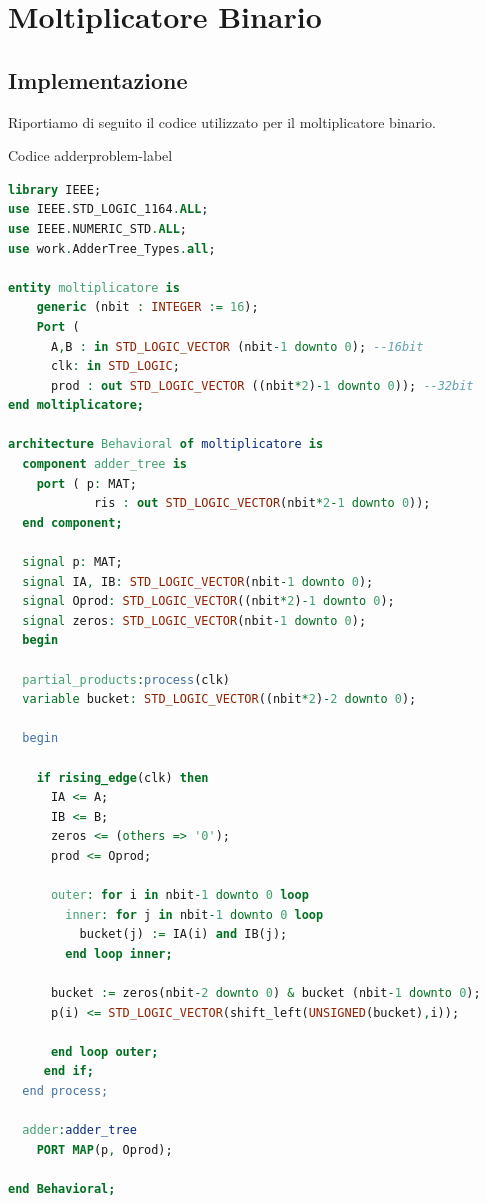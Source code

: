 \clearpage
\section{Moltiplicatore Binario}

\subsection{Implementazione}
Riportiamo di seguito il codice utilizzato per il moltiplicatore binario.

\begin{problem}{Codice adder}{problem-label}
\begin{lstlisting}[language=VHDL]
library IEEE;
use IEEE.STD_LOGIC_1164.ALL;
use IEEE.NUMERIC_STD.ALL;
use work.AdderTree_Types.all;

entity moltiplicatore is
    generic (nbit : INTEGER := 16);
    Port ( 
      A,B : in STD_LOGIC_VECTOR (nbit-1 downto 0); --16bit
      clk: in STD_LOGIC;
      prod : out STD_LOGIC_VECTOR ((nbit*2)-1 downto 0)); --32bit
end moltiplicatore;

architecture Behavioral of moltiplicatore is
  component adder_tree is
    port ( p: MAT;
            ris : out STD_LOGIC_VECTOR(nbit*2-1 downto 0));
  end component;
  
  signal p: MAT;
  signal IA, IB: STD_LOGIC_VECTOR(nbit-1 downto 0);
  signal Oprod: STD_LOGIC_VECTOR((nbit*2)-1 downto 0);
  signal zeros: STD_LOGIC_VECTOR(nbit-1 downto 0);
  begin     
  
  partial_products:process(clk)
  variable bucket: STD_LOGIC_VECTOR((nbit*2)-2 downto 0);

  begin
   
    if rising_edge(clk) then
      IA <= A;
      IB <= B;
      zeros <= (others => '0');
      prod <= Oprod;
      
      outer: for i in nbit-1 downto 0 loop
        inner: for j in nbit-1 downto 0 loop
          bucket(j) := IA(i) and IB(j);
        end loop inner;
        
      bucket := zeros(nbit-2 downto 0) & bucket (nbit-1 downto 0);
      p(i) <= STD_LOGIC_VECTOR(shift_left(UNSIGNED(bucket),i));
      
      end loop outer;
     end if;
  end process;
  
  adder:adder_tree
    PORT MAP(p, Oprod);
    
end Behavioral;
\end{lstlisting}
\end{problem}

